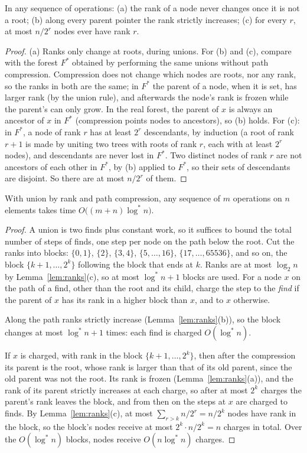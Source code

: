 \begin{lemma}\label{lem:ranks}
In any sequence of operations: (a) the rank of a node never changes once it is not a root; (b) along every parent pointer the rank strictly increases;
(c) for every $r$, at most $n/2^r$ nodes ever have rank $r$.
\end{lemma}
\begin{proof}
(a) Ranks only change at roots, during unions. For (b) and (c), compare with the forest $F^*$ obtained by performing the same unions without path compression.
Compression does not change which nodes are roots, nor any rank, so the ranks in both are the same; in $F^*$ the parent of a node, when it is set,
has larger rank (by the union rule), and afterwards the node's rank is frozen while the parent's can only grow. In the real forest, the parent of $x$ is always an ancestor
of $x$ in $F^*$ (compression points nodes to ancestors), so (b) holds. For (c): in $F^*$, a node of rank $r$ has at least $2^r$ descendants, by induction (a root of
rank $r+1$ is made by uniting two trees with roots of rank $r$, each with at least $2^r$ nodes), and descendants are never lost in $F^*$. Two distinct nodes of rank $r$ are
not ancestors of each other in $F^*$, by (b) applied to $F^*$, so their sets of descendants are disjoint. So there are at most $n/2^r$ of them.
\end{proof}

\begin{theorem}\label{thm:logstar}
With union by rank and path compression, any sequence of $m$ operations on $n$ elements takes time $O\bigl((m+n)\log^*n\bigr)$.
\end{theorem}
\begin{proof}
A union is two finds plus constant work, so it suffices to bound the total number of steps of finds, one step per node on the path below the root. Cut the
ranks into blocks: $\{0,1\}$, $\{2\}$, $\{3,4\}$, $\{5,\dots,16\}$, $\{17,\dots,65536\}$, and so on, the block $\{k+1,\dots,2^k\}$ following the block that ends at $k$. Ranks are at most $\log_2n$
by Lemma~\ref{lem:ranks}(c), so at most $\log^*n+1$ blocks are used. For a node $x$ on the path of a find, other than the root and its child, charge the step to
the \emph{find} if the parent of $x$ has its rank in a higher block than $x$, and to $x$ otherwise.

Along the path ranks strictly increase (Lemma~\ref{lem:ranks}(b)), so the block changes at most $\log^*n+1$ times: each find is charged $O(\log^*n)$.

If $x$ is charged, with rank in the block $\{k+1,\dots,2^k\}$, then after the compression its parent is the root, whose rank is larger than that of its old parent,
since the old parent was not the root. Its rank is frozen (Lemma~\ref{lem:ranks}(a)), and the rank of its parent strictly increases at each charge, so after at most $2^k$
charges the parent's rank leaves the block, and from then on the steps at $x$ are charged to finds. By Lemma~\ref{lem:ranks}(c), at most
$\sum_{r>k}n/2^r=n/2^k$ nodes have rank in the block, so the block's nodes receive at most $2^k\cdot n/2^k=n$ charges in total. Over the $O(\log^*n)$ blocks, nodes
receive $O(n\log^*n)$ charges.
\end{proof}

